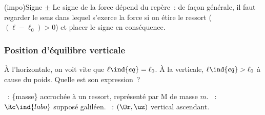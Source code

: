\documentclass[../../main/main.tex]{subfiles}
\begin{document}
\begin{tcb*}(impo){Signe $\pm$}
	Le signe de la force dépend du repère~: de façon générale, il faut
	regarder le sens dans lequel s’exerce la force si on étire le ressort ($(\ell
		- \ell_0) > 0$) et placer le signe en conséquence.
\end{tcb*}

\subsubsection{Position d'équilibre verticale}
\noindent
\begin{minipage}{0.75\linewidth}
	À l'horizontale, on voit vite que $\ell\ind{eq} = \ell_0$. À la verticale,
	$\ell\ind{eq} > \ell_0$ à cause du poids. Quelle est son expression~?
	\begin{enumerate}[label=\sqenumi]
		~: \{masse\} accrochée à un ressort, représenté par M de masse
		$m$.
		~: $\Rc\ind{labo}$ supposé galiléen.
		~: $(\Or, \uz)$ vertical ascendant.
	\end{enumerate}
\end{minipage}
\hfill
\end{document}
